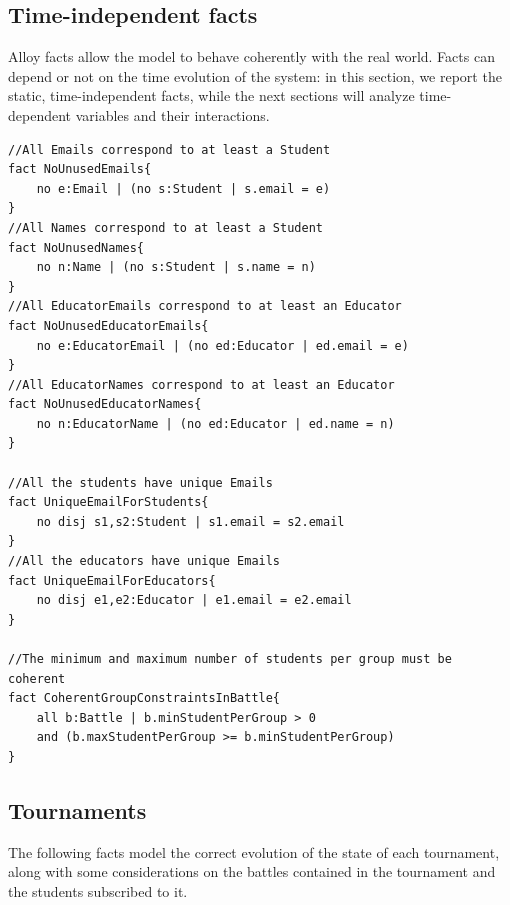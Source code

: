 \subsection{Time-independent facts}
Alloy facts allow the model to behave coherently with the real world. Facts can depend or not on the time evolution of the system: in this section, we report the static, time-independent facts, while the next sections will analyze time-dependent variables and their interactions.

\begin{verbatim}
//All Emails correspond to at least a Student
fact NoUnusedEmails{
    no e:Email | (no s:Student | s.email = e)
}
//All Names correspond to at least a Student
fact NoUnusedNames{
    no n:Name | (no s:Student | s.name = n)
}
//All EducatorEmails correspond to at least an Educator
fact NoUnusedEducatorEmails{
    no e:EducatorEmail | (no ed:Educator | ed.email = e)
}
//All EducatorNames correspond to at least an Educator
fact NoUnusedEducatorNames{
    no n:EducatorName | (no ed:Educator | ed.name = n)
}

//All the students have unique Emails
fact UniqueEmailForStudents{
    no disj s1,s2:Student | s1.email = s2.email
}
//All the educators have unique Emails
fact UniqueEmailForEducators{
    no disj e1,e2:Educator | e1.email = e2.email
}

//The minimum and maximum number of students per group must be coherent
fact CoherentGroupConstraintsInBattle{
    all b:Battle | b.minStudentPerGroup > 0
    and (b.maxStudentPerGroup >= b.minStudentPerGroup)
}
\end{verbatim}

\subsection{Tournaments}
The following facts model the correct evolution of the state of each tournament, along with some considerations on the battles contained in the tournament and the students subscribed to it.

